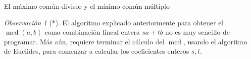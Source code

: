 \documentclass[11pt,spanish,makeidx]{amsbook}
\theoremstyle{definition}
\newtheorem{ejemplo}{Ejemplo}[section]
\theoremstyle{remark}
\newtheorem{observacion}{Observaci\'on}[section]
\newcommand \mcd{\operatorname{mcd}}
\begin{document}
\begin{section}{El máximo común divisor y el mínimo común múltiplo}
\begin{comment}
\begin{ejemplo} Supongamos que $a$, $a'$, $b$, $b'$ son enteros positivos que satisfacen
$$
\text{({\em i}) }\quad ab'=a'b; \qquad\quad\text{(ii) }
\quad\mcd(a,b)=\mcd(a',b')=1.
$$
Entonces $a=a'$ y $b=b' $.

(La condición ({\em i}) podría escribirse como $a/b=a'/b'$, pero preferimos usar esta forma que no asume ningún conocimiento sobre fracciones.)
\end{ejemplo}
\begin{proof} Como el $\mcd (a,b) =1$ existen enteros $s$ y $t$ tales que $sa+tb=1$. En consecuencia
$$
b'=(sa+tb)b' =sab'+tbb' = sa'b + tbb'=(sa'+tb')b,
$$
y por lo tanto $b|b'$. Por un argumento similar y usando el hecho de que el $\mcd(a',b')=1 $ deducimos que $b|b'$, por lo tanto $b=b'$ o $b=-b'$ y como $b $ y $b'$ son ambos positivos debemos tener $b=b'$ . Ahora de (i) deducimos que $a=a'$ y el resultado esta demostrado.
\end{proof}
	
\end{comment}

\begin{observacion}[*]
El  algoritmo explicado anteriormente para obtener el $\mcd(a,b)$ como combinación lineal entera $sa+tb$ no es muy sencillo de programar. Más aún, requiere terminar el cálculo del $\mcd$, usando el algoritmo de Euclides, para comenzar a calcular los coeficientes enteros $s,t$. 


\end{observacion}
\end{section}
\end{document}
